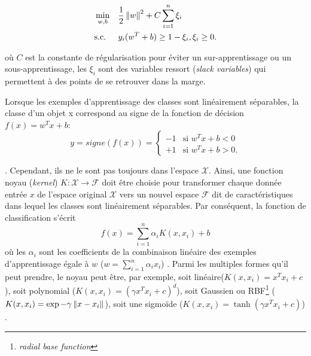 \begin{equation*}
\begin{aligned}
& \mathop{\mathrm{min}}\limits\limits_{w,b}
& &\frac{1}{2}\left\lVert w\right\rVert^2 + C \sum\limits^n_{i=1} \xi_i \\
& \text{s.c.}
& & y_i(w^T+b)\geq 1-\xi_i, \xi_i \geq 0.
\end{aligned}
\end{equation*}

où $C$ est la constante de régularisation pour éviter un sur-apprentissage ou un sous-apprentissage, les $\xi_i$ sont des variables ressort (\textit{slack variables}) qui permettent à des points de se retrouver dans la marge. 


Lorsque les exemples d'apprentissage des classes sont linéairement séparables, la classe d'un objet x correspond au signe de la fonction de décision $f(x) = w^T x + b$:
\[
y = signe(f(x))=
\left\{ \begin{array}{ll}
-1 & \text{si }w^Tx+b<0\\
+1 & \text{si }w^Tx+b>0.
\end{array}
\right.
\]


. Cependant, ils ne le sont pas toujours dans l'espace $\mathcal{X}$. Ainsi, une fonction \og noyau \fg{} (\textit{kernel}) $K: \mathcal{X} \longrightarrow \mathcal{F}$ doit être choisie pour transformer chaque donnée entrée $x$ de l'espace original $\mathcal{X}$ vers un nouvel espace $\mathcal{F}$ dit de caractéristiques dans lequel les classes sont linéairement séparables. Par conséquent, la fonction de classification s'écrit \[f(x) = \sum\limits_{i=1}^n \alpha_i K(x,x_i) + b\] où les $\alpha_i$ sont les coefficients de la combinaison linéaire des exemples d'apprentissage égale à $w$ ($w = \sum\limits_{i=1}^n\alpha_i x_i$) \citep{Ben-Hur2010svm}. Parmi les multiples formes qu'il peut prendre, le noyau peut être, par exemple, soit linéaire($K(x,x_i) = x^Tx_i + c$), soit polynomial ($K(x,x_i) = (\gamma x^Tx_i + c)^d$), soit Gaussien ou RBF\footnote{\textit{radial base function}} ($K(x,x_i) = \exp{-\gamma \left\lVert x-x_i\right\rVert}$), soit une sigmoïde ($K(x,x_i) = \tanh(\gamma x^Tx_i + c)$) \citep{Amami2013PracticalModelSelectionSVM}.

